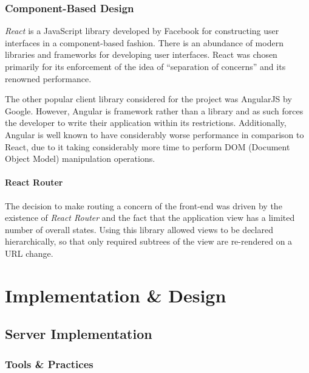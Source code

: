 \documentclass{l4proj}
\begin{document}
    \subsection{Component-Based Design}

        \textit{React} is a JavaScript library developed by Facebook for constructing user interfaces in a component-based fashion. There is an abundance of modern libraries and frameworks for developing user interfaces. React was chosen primarily for its enforcement of the idea of ``separation of concerns'' and its renowned performance.
        
        The other popular client library considered for the project was AngularJS by Google. However, Angular is framework rather than a library and as such forces the developer to write their application within its restrictions. Additionally, Angular is well known to have considerably worse performance in comparison to React, due to it taking considerably more time to perform DOM (Document Object Model) manipulation operations.

        \subsubsection{React Router}
        The decision to make routing a concern of the front-end was driven by the existence of \textit{React Router} and the fact that the application view has a limited number of overall states. Using this library allowed views to be declared hierarchically, so that only required subtrees of the view are re-rendered on a URL change.
        
        





\chapter{Implementation \& Design}
                    

\section{Server Implementation}

    \subsection{Tools \& Practices}
    
\end{document}
